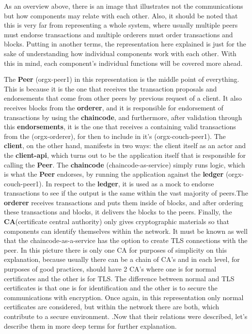 As an overview above, there is an image that illustrates not the communications but how components may relate with each other. Also, it should be noted that this is very far from representing a whole system, where usually multiple peers must endorse transactions and multiple orderers must order transactions and blocks. Putting in another terms, the representation here explained is just for the sake of understanding how individual components work with each other. With this in mind, each component's individual functions will be covered more ahead.

The \textbf{Peer} (orgx-peer1) in this representation is the middle point of everything. This is because it is the one that receives the transaction proposals and endorsements that come from other peers by previous request of a client. It also receives blocks from the \textbf{orderer}, and it is responsible for endorsement of transactions by using the \textbf{chaincode}, and furthermore, after validation through this \textbf{endorsements}, it is the one that receives a  containing valid transactions from the  (orgx-orderer), for then to include in it's  (orgx-couch-peer1). The \textbf{client}, on the other hand, manifests in two ways: the client itself as an actor and the \textbf{client-api}, which turns out to be the application itself that is responsible for calling the \textbf{Peer}. The \textbf{chaincode} (chaincode-as-service) simply runs logic, which is what the \textbf{Peer} endorses, by running the application against the \textbf{ledger} (orgx-couch-peer1). In respect to the \textbf{ledger}, it is used as a mock to endorse transactions to see if the output is the same within the vast majority of peers.The \textbf{orderer} receives transactions and puts them inside of blocks, and after ordering these transactions and blocks, it delivers the blocks to the peers. Finally, the \textbf{CA}(certificate central authority) only gives cryptographic materials so that components can identify themselves within the network. It must be known as well that the chaincode-as-a-service has the option to create TLS connections with the peer. In this picture there is only one CA for purposes of simplicity on this explanation, because usually there can be a chain of CA's and in each level, for purposes of good practices, should have 2 CA's where one is for normal certificates and the other is for TLS. The difference between normal and TLS certificates is that one is for identification and the other is to secure the communications with encryption. Once again, in this representation only normal certificates are considered, but within the network there are both, which contribute to a secure environment. \cite{rfc5280}.Now that their relations were described, let's describe them in more deep terms for further explanation.

